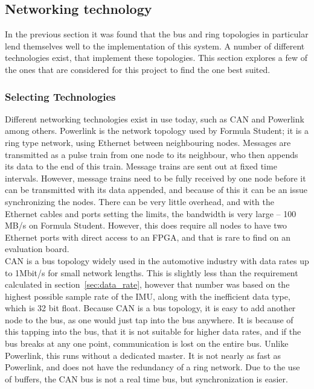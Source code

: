 \subsection{Networking technology}\label{sec:CAN-bus}
In the previous section it was found that the bus and ring topologies in particular lend themselves well to the implementation of this system.
A number of different technologies exist, that implement these topologies. 
This section explores a few of the ones that are considered for this project to find the one best suited.

\subsubsection*{Selecting Technologies}
Different networking technologies exist in use today, such as CAN and Powerlink among others.
Powerlink is the network topology used by Formula Student; it is a ring type network, using Ethernet between neighbouring nodes.
Messages are transmitted as a pulse train from one node to its neighbour, who then appends its data to the end of this train. 
Message trains are sent out at fixed time intervals.
However, message trains need to be fully received by one node before it can be transmitted with its data appended, and because of this it can be an issue synchronizing the nodes.
There can be very little overhead, and with the Ethernet cables and ports setting the limits, the bandwidth is very large -- 100 MB/s on Formula Student.
However, this does require all nodes to have two Ethernet ports with direct access to an FPGA, and that is rare to find on an evaluation board.\\

CAN is a bus topology widely used in the automotive industry with data rates up to 1Mbit/s for small network lengths.
This is slightly less than the requirement calculated in section~\ref{sec:data_rate}, however that number was based on the highest possible sample rate of the IMU, along with the inefficient data type, which is 32 bit float.
Because CAN is a bus topology, it is easy to add another node to the bus, as one would just tap into the bus anywhere.
It is because of this tapping into the bus, that it is not suitable for higher data rates, and if the bus breaks at any one point, communication is lost on the entire bus.
Unlike Powerlink, this runs without a dedicated master.
It is not nearly as fast as Powerlink, and does not have the redundancy of a ring network.
Due to the use of buffers, the CAN bus is not a real time bus, but synchronization is easier.\\

